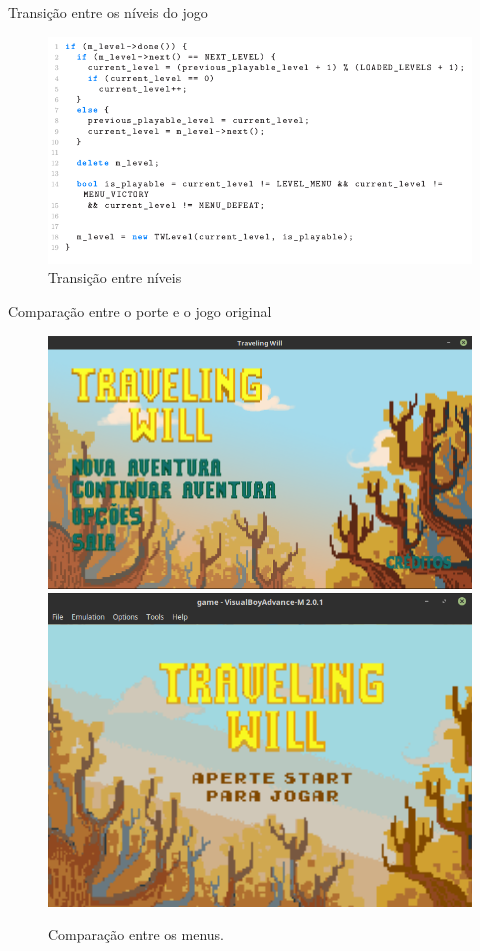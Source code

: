 \documentclass[notes, mathserif]{beamer}
\begin{document}
\begin{frame}{Transi\c c\~ao entre os n\'iveis do jogo}
	\begin{figure}[H]
		\includegraphics[width=.8\linewidth]{figuras/transicao.png}
		\centering
		\caption{Transi\c c\~ao entre n\'iveis}
		\label{fig:vsync}
	\end{figure}
\end{frame}

\begin{frame}{Compara\c c\~ao entre o porte e o jogo original}
	\begin{figure}%
    \includegraphics[width=.5\linewidth]{figuras/pc-menu.png}
    \qquad
    \includegraphics[width=.4\linewidth]{figuras/gba-menu.png}
    \caption{Compara\c c\~ao entre os menus.}%
    \label{fig:comp1}%
	\end{figure}
\end{frame}
\end{document}
